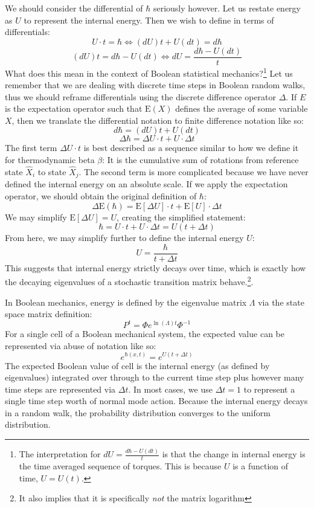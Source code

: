 \documentclass[10pt, a5paper, twoside, openright]{memoir}
\begin{document}
We should consider the differential of $\hbar$ seriously however. Let us restate energy as $U$ to represent the internal energy. Then we wish to define in terms of differentials:
$$U \cdot t = \hbar \iff (d U) t + U (d t) = d \hbar$$
$$(d U) t = d \hbar - U (d t) \iff d U = \frac{d \hbar - U (d t)}{t}$$
What does this mean in the context of Boolean statistical mechanics?\footnote{The interpretation for $d U = \frac{d \hbar - U (d t)}{t}$ is that the change in internal energy is the time averaged sequence of torques. This is because $U$ is a function of time, $U = U(t)$.} Let us remember that we are dealing with discrete time steps in Boolean random walks, thus we should reframe differentials using the discrete difference operator $\Delta$. If $E$ is the expectation operator such that $\mathrm{E}(X)$ defines the average of some variable $X$, then we translate the differential notation to finite difference notation like so:
$$d \hbar = (d U) t + U (d t)$$
$$\Delta \hbar = \Delta U \cdot t + U \cdot \Delta t$$
The first term $\Delta U \cdot t$ is best described as a sequence similar to how we define it for thermodynamic beta $\beta$: It is the cumulative sum of rotations from reference state $\hat X_i$ to state $\hat X_j$. The second term is more complicated because we have never defined the internal energy on an absolute scale.
If we apply the expectation operator, we should obtain the original definition of $\hbar$:
$$\Delta \mathrm{E}(\hbar) = \mathrm{E}[\Delta U] \cdot t + \mathrm{E}[U] \cdot \Delta t$$
We may simplify $\mathrm{E}[\Delta U] = U$, creating the simplified statement:
$$\hbar = U \cdot t + U \cdot \Delta t = U (t + \Delta t)$$
From here, we may simplify further to define the internal energy $U$:
$$U = \frac{\hbar}{t + \Delta t}$$
This suggests that internal energy strictly decays over time, which is exactly how the decaying eigenvalues of a stochastic transition matrix behave.\footnote{It also implies that it is specifically \textit{not} the matrix logarithm}.

In Boolean mechanics, energy is defined by the eigenvalue matrix $\Lambda$ via the state space matrix definition:
$$P^t = \Phi e^{\ln(\Lambda) t} \Phi^{-1}$$
For a single cell of a Boolean mechanical system, the expected value can be represented via abuse of notation like so:
$$e^{\hbar(x, t)} = e^{U (t + \Delta t)}$$
The expected Boolean value of cell is the internal energy (as defined by eigenvalues) integrated over through to the current time step plus however many time steps are represented via $\Delta t$. In most cases, we use $\Delta t = 1$ to represent a single time step worth of normal mode action. Because the internal energy decays in a random walk, the probability distribution converges to the uniform distribution.
\end{document}
